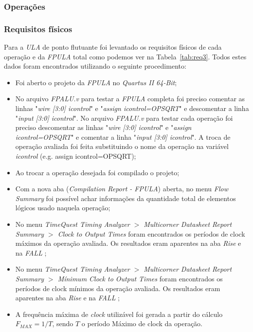 \documentclass[12pt]{article}
\begin{document}
\subsubsection{Operações}
\label{subsubsec:3op}


\subsubsection{Requisitos físicos}
\label{subsubsec:fpulafis}

Para a \textit{ULA} de ponto flutuante foi levantado os requisitos físicos de cada operação e da \textit{FPULA} total como podemos ver na Tabela~\ref{tab:req3}. Todos estes dados foram encontrados utilizando o seguinte procedimento:

\begin{itemize}
	\item Foi aberto o projeto da \textit{FPULA} no \textit{Quartus II 64-Bit};
	\item No arquivo \textit{FPALU.v} para testar a \textit{FPULA} completa foi preciso comentar as linhas "\textit{wire [3:0] icontrol}" e "\textit{assign icontrol=OPSQRT}" e descomentar a linha "\textit{input [3:0] icontrol}". No arquivo \textit{FPALU.v} para testar cada operação foi preciso descomentar as linhas "\textit{wire [3:0] icontrol}" e "\textit{assign icontrol=OPSQRT}" e comentar a linha "\textit{input [3:0] icontrol}". A troca de operação avaliada foi feita substituindo o nome da operação na variável \textit{icontrol} (e.g. assign icontrol=OPSQRT);
	\item Ao trocar a operação desejada foi compilado o projeto;
	\item Com a nova aba (\textit{Compilation Report - FPULA}) aberta, no menu \textit{Flow Summary} foi possível achar informações da quantidade total de elementos lógicos usado naquela operação;
	\item No menu \textit{TimeQuest Timing Analyzer $>$ Multicorner Datasheet Report Summary $>$ Clock to Output Times} foram encontrados os períodos de clock máximos da operação avaliada. Os resultados eram aparentes na aba \textit{Rise} e na \textit{FALL} \cite{altera};
	\item No menu \textit{TimeQuest Timing Analyzer $>$ Multicorner Datasheet Report Summary $>$ Mínimum Clock to Output Times} foram encontrados os períodos de clock mínimos da operação avaliada. Os resultados eram aparentes na aba \textit{Rise} e na \textit{FALL} \cite{altera};
	\item A frequência máxima de \textit{clock} utilizável foi gerada a partir do cálculo $F_{MAX} = 1/T$, sendo $T$ o período Máximo de clock da operação.
\end{itemize}
\end{document}
